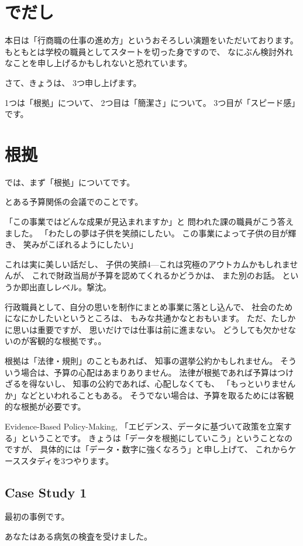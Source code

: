 \documentclass[uplatex,jis2004,dvipdfmx,12pt]{jsarticle}
\begin{document}
\section{でだし}
本日は「行商職の仕事の進め方」というおそろしい演題をいただいております。
もともとは学校の職員としてスタートを切った身ですので、
なにぶん検討外れなことを申し上げるかもしれないと恐れています。

さて、きょうは、
3つ申し上げます。

1つは「根拠」について、
2つ目は「簡潔さ」について。
3つ目が「スピード感」です。


\section{根拠}
では、まず「根拠」についてです。

とある予算関係の会議でのことです。

「この事業ではどんな成果が見込まれますか」と
問われた課の職員がこう答えました。
「わたしの夢は子供を笑顔にしたい。
この事業によって子供の目が輝き、
笑みがこぼれるようにしたい」

これは実に美しい話だし、
子供の笑顔4---これは究極のアウトカムかもしれませんが、
これで財政当局が予算を認めてくれるかどうかは、
また別のお話。
というか即出直しレベル。撃沈。

行政職員として、自分の思いを制作にまとめ事業に落とし込んで、
社会のためになにかしたいというところは、
もみな共通かなとおもいます。
ただ、たしかに思いは重要ですが、
思いだけでは仕事は前に進まない。
どうしても欠かせないのが客観的な根拠です。。

根拠は「法律・規則」のこともあれば、
知事の選挙公約かもしれません。
そういう場合は、予算の心配はあまりありません。
法律が根拠であれば予算はつけざるを得ないし、
知事の公約であれば、心配しなくても、
「もっといりませんか」などといわれることもある。
そうでない場合は、予算を取るためには客観的な根拠が必要です。

Evidence-Based Policy-Making,
「エビデンス、データに基づいて政策を立案する」ということです。
きょうは「データを根拠にしていこう」ということなのですが、
具体的には「データ・数字に強くなろう」と申し上げて、
これからケーススタディを3つやります。

\subsection{Case Study 1}
最初の事例です。

あなたはある病気の検査を受けました。
\end{document}
